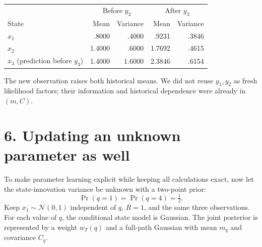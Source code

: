 \documentclass[10pt,a4paper]{article}
\newcommand{\Normal}{\mathcal N}
\begin{document}
\begin{center}
\begin{tabular}{lrrrr}\toprule
&\multicolumn{2}{c}{Before $y_3$}&\multicolumn{2}{c}{After $y_3$}\\
State & Mean & Variance & Mean & Variance\\\midrule
$x_1$ & .8000 & .4000 & .9231 & .3846\\
$x_2$ & 1.4000 & .6000 & 1.7692 & .4615\\
$x_3$ (prediction before $y_3$) & 1.4000 & 1.6000 & 2.3846 & .6154\\\bottomrule
\end{tabular}
\par\medskip
{}
\end{center}
The new observation raises both historical means. We did not reuse $y_1,y_2$ as fresh
likelihood factors; their information and historical dependence were already in $(m,C)$.

\clearpage
\section*{6. Updating an unknown parameter as well}
To make parameter learning explicit while keeping all calculations exact, now let the
state-innovation variance be unknown with a two-point prior:
\[
\Pr(q=1)=\Pr(q=4)=\tfrac12.
\]
Keep $x_1\sim\Normal(0,1)$ independent of $q$, $R=1$, and the same three observations.
For each value of $q$, the conditional state model is Gaussian. The joint posterior is
represented by a weight $w_T(q)$ and a full-path Gaussian with mean $m_q$ and covariance $C_q$.
\end{document}
